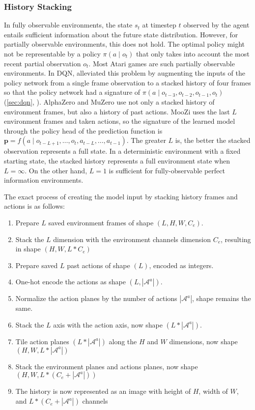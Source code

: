 \subsubsection{History Stacking} \label{sec:history_stacking}
In fully observable environments, the state $s_t$ at timestep $t$ observed by the agent entails sufficient information about the future state distribution.
However, for partially observable environments, this does not hold.
The optimal policy might not be representable by a policy $\pi(a \mid o_t)$ that only takes into account the most recent partial observation $o_t$.
Most Atari games are such partially observable environments.
In DQN, \citeauthor{PlayingAtariDeep_Mnih.Kavukcuoglu.ea_2013} alleviated this problem by augmenting the inputs of the policy network from a single frame observation to a stacked history of four frames so that the policy network had a signature of $\pi(a \mid o_{t-3}, o_{t-2}, o_{t-1}, o_t)$ (\ref{sec:dqn}, \cite{PlayingAtariDeep_Mnih.Kavukcuoglu.ea_2013}).
AlphaZero and MuZero use not only a stacked history of environment frames, but also a history of past actions.
MooZi uses the last $L$ environment frames and taken actions, so the signature of the learned model through the policy head of the prediction function is $\mathbf{p} = f(a \mid o_{t - L + 1}, \dots, o_t, a_{t - L}, \dots, a_{t-1})$.
The greater $L$ is, the better the stacked observation represents a full state.
In a deterministic environment with a fixed starting state, the stacked history represents a full environment state when $L = \infty$.
On the other hand, $L = 1$ is sufficient for fully-observable perfect information environments.

The exact process of creating the model input by stacking history frames and actions is as follows:
\begin{enumerate}
    \item Prepare $L$ saved environment frames of shape $(L, H, W, C_e)$.
    \item Stack the $L$ dimension with the environment channels dimension $C_e$, resulting in shape $(H, W, L * C_e)$
    \item Prepare saved $L$ past actions of shape $(L)$, encoded as integers.
    \item One-hot encode the actions as shape $(L, |\mathcal{A}^a|)$.
    \item Normalize the action planes by the number of actions $|\mathcal{A}^a|$, shape remains the same.
    \item Stack the $L$ axis with the action axis, now shape $(L * |\mathcal{A}^a|)$.
    \item Tile action planes $(L * |\mathcal{A}^a|)$ along the $H$ and $W$ dimensions, now shape $(H, W, L * |\mathcal{A}^a|)$
    \item Stack the environment planes and actions planes, now shape $(H, W, L * (C_e + |\mathcal{A}^a|))$
    \item The history is now represented as an image with height of $H$, width of $W$, and $L * (C_e + |\mathcal{A}^a|)$ channels
\end{enumerate}

